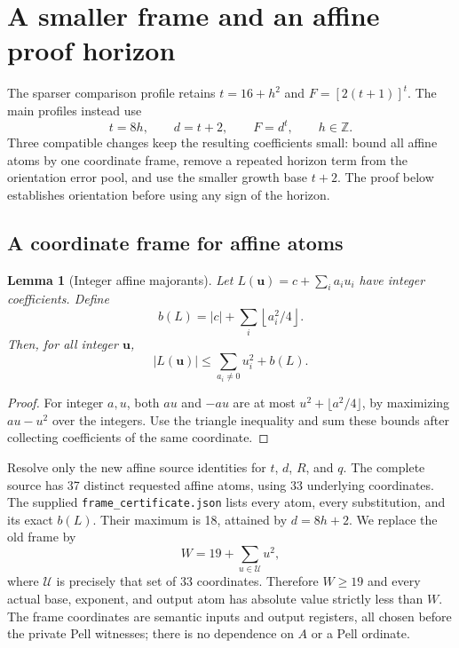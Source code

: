 \documentclass[11pt]{article}
\newtheorem{lemma}[theorem]{Lemma}
\theoremstyle{remark}\newtheorem{remark}[theorem]{Remark}
\newcommand{\Z}{\mathbb Z}\newcommand{\N}{\mathbb N}
\begin{document}
\section{A smaller frame and an affine proof horizon}

The sparser comparison profile retains $t=16+h^2$ and
$F=[2(t+1)]^t$. The main profiles instead use
\begin{equation}\label{eq:horizons}
             t=8h,\qquad d=t+2,\qquad F=d^t,
             \qquad h\in\Z.
\end{equation}
Three compatible changes keep the resulting coefficients small: bound
all affine atoms by one coordinate frame, remove a repeated horizon
term from the orientation error pool, and use the smaller growth base
$t+2$. The proof below establishes orientation before using any sign
of the horizon.

\subsection{A coordinate frame for affine atoms}

\begin{lemma}[Integer affine majorants]\label{lem:frame}
Let $L(\boldsymbol u)=c+\sum_i a_i u_i$ have integer coefficients.
Define
\[
 b(L)=|c|+\sum_i\left\lfloor a_i^2/4\right\rfloor.
\]
Then, for all integer $\boldsymbol u$,
\[
 |L(\boldsymbol u)|\le\sum_{a_i\ne0}u_i^2+b(L).
\]
\end{lemma}
\begin{proof}
For integer $a,u$, both $au$ and $-au$ are at most
$u^2+\lfloor a^2/4\rfloor$, by maximizing $au-u^2$ over the integers.
Use the triangle inequality and sum these bounds after collecting
coefficients of the same coordinate.
\end{proof}

Resolve only the new affine source identities for $t$, $d$, $R$, and $q$.
The complete source has 37 distinct requested affine atoms, using 33
underlying coordinates. The supplied \texttt{frame\_certificate.json}
lists every atom, every substitution, and its exact $b(L)$. Their maximum
is 18, attained by $d=8h+2$. We replace the old frame by
\begin{equation}\label{eq:coordinateframe}
                   W=19+\sum_{u\in\mathcal U}u^2,
\end{equation}
where $\mathcal U$ is precisely that set of 33 coordinates. Therefore
$W\ge19$ and every actual base, exponent, and output atom has absolute
value strictly less than $W$. The frame coordinates are semantic inputs
and output registers, all chosen before the private Pell witnesses;
there is no dependence on $A$ or a Pell ordinate.
\end{document}
